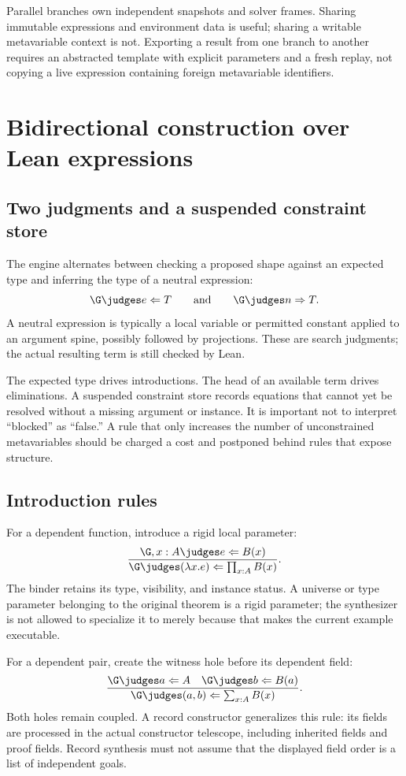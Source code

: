Parallel branches own independent snapshots and solver frames. Sharing
immutable expressions and environment data is useful; sharing a writable
metavariable context is not. Exporting a result from one branch to another
requires an abstracted template with explicit parameters and a fresh replay,
not copying a live expression containing foreign metavariable identifiers.

\section{Bidirectional construction over Lean expressions}\label{sec:bidirectional}

\subsection{Two judgments and a suspended constraint store}

The engine alternates between checking a proposed shape against an expected
type and inferring the type of a neutral expression:
\[
 \G\judges e\Leftarrow T
 \qquad\text{and}\qquad
 \G\judges n\Rightarrow T.
\]
A neutral expression is typically a local variable or permitted constant
applied to an argument spine, possibly followed by projections. These are
search judgments; the actual resulting term is still checked by Lean.

The expected type drives introductions. The head of an available term drives
eliminations. A suspended constraint store records equations that cannot yet be
resolved without a missing argument or instance. It is important not to
interpret ``blocked'' as ``false.'' A rule that only increases the number of
unconstrained metavariables should be charged a cost and postponed behind rules
that expose structure.

\subsection{Introduction rules}

For a dependent function, introduce a rigid local parameter:
\[
 \frac{\G,x:A\judges e\Leftarrow B(x)}
      {\G\judges (\lambda x.e)\Leftarrow \prod_{x:A}B(x)}.
\]
The binder retains its type, visibility, and instance status. A universe or
type parameter belonging to the original theorem is a rigid parameter; the
synthesizer is not allowed to specialize it to  merely because that
makes the current example executable.

For a dependent pair, create the witness hole before its dependent field:
\[
 \frac{\G\judges a\Leftarrow A\quad
       \G\judges b\Leftarrow B(a)}
      {\G\judges (a,b)\Leftarrow \sum_{x:A}B(x)}.
\]
Both holes remain coupled. A record constructor generalizes this rule: its
fields are processed in the actual constructor telescope, including inherited
fields and proof fields. Record synthesis must not assume that the displayed
field order is a list of independent goals.


